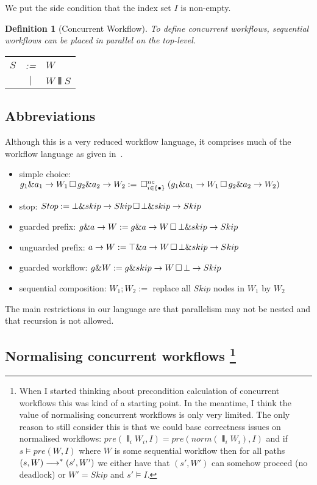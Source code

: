 \documentclass[11pt]{article}
\newcommand{\TODO}[1]{{\color{red} #1}}
\newtheorem{definition}{Definition}
\begin{document}
We put the side condition that the index set $I$ is non-empty.

\begin{definition}[Concurrent Workflow]
To define concurrent workflows, sequential workflows can be placed in parallel on the top-level.

\begin{tabular}{c c l}
  $S$ & :=  & $W$ \\
      & $|$ & $W \interleave S$    	 
\end{tabular}
\end{definition}

\subsection{Abbreviations}

Although this is a very reduced workflow language, it comprises much of the workflow language as given in~\cite{Wang2012}.

\begin{itemize}
  \item simple choice: $g_1 \& a_1 \rightarrow W_1 \, \Box \, g_2 \& a_2 \rightarrow W_2 := \, \Box^{nc}_{i \in \{\bullet\}}\; (g_1 \& a_1 \rightarrow W_1 \, \Box \, g_2 \& a_2 \rightarrow W_2)$
  \item stop: $Stop := \bot \& skip \rightarrow Skip \, \Box \, \bot \& skip \rightarrow Skip$
  \item guarded prefix: $g\&a \rightarrow W := g \& a \rightarrow W \, \Box \, \bot \& skip \rightarrow Skip$
  \item unguarded prefix: $a \rightarrow W := \top \& a \rightarrow W \, \Box \, \bot \& skip \rightarrow Skip$ 
  \item guarded workflow: $g \& W := g \& skip \rightarrow W \, \Box \, \bot \rightarrow Skip$
  \item sequential composition: $W_1 ; W_2 :=$ replace all $Skip$ nodes in $W_1$ by $W_2$
\end{itemize}

The main restrictions in our language are that parallelism may not be nested and that recursion is not allowed. 

\subsection[Normalising concurrent workflows]{Normalising concurrent workflows
\footnote{\TODO{When I started thinking about precondition calculation of concurrent workflows this was kind of a starting point. In the meantime, I think the value of normalising concurrent workflows is only very limited. The only reason to still consider this is that we could base correctness issues on normalised workflows: $pre(\interleave_i W_i,I) = pre(norm(\interleave_i W_i),I)$ and if $s \models pre(W,I)$ where $W$ is some sequential workflow then for all paths $(s,W) \stackrel{}{\longrightarrow}^* (s',W')$ we either have that $(s',W')$ can somehow proceed (no deadlock) or $W' = Skip$ and $s' \models I$.}}}
\end{document}
